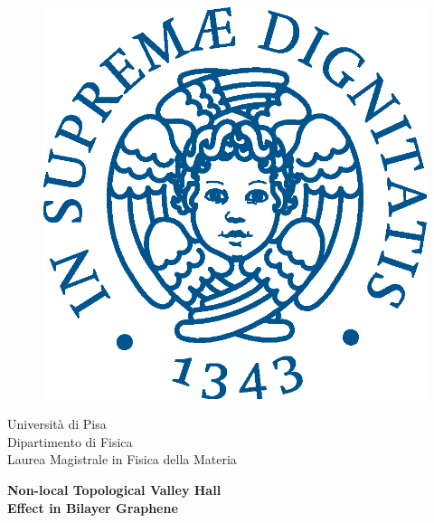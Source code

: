\begin{titlepage}
\begin{figure}[!htb]
    \centering
    \includegraphics[keepaspectratio=true,scale=0.5]{Immagini/cherubino.eps}
\end{figure}

\begin{center}
    \LARGE{Università di Pisa}
    \vspace{5mm}
    \\ \large{Dipartimento di Fisica}
    \vspace{5mm}
    \\ \LARGE{Laurea Magistrale in Fisica della Materia}
\end{center}

\vspace{15mm}
\begin{center}
    {\LARGE{\bf Non-local Topological Valley Hall\\ \vspace{5mm} Effect in Bilayer Graphene}}
    
    
\end{center}
\vspace{20mm}


\end{titlepage}
